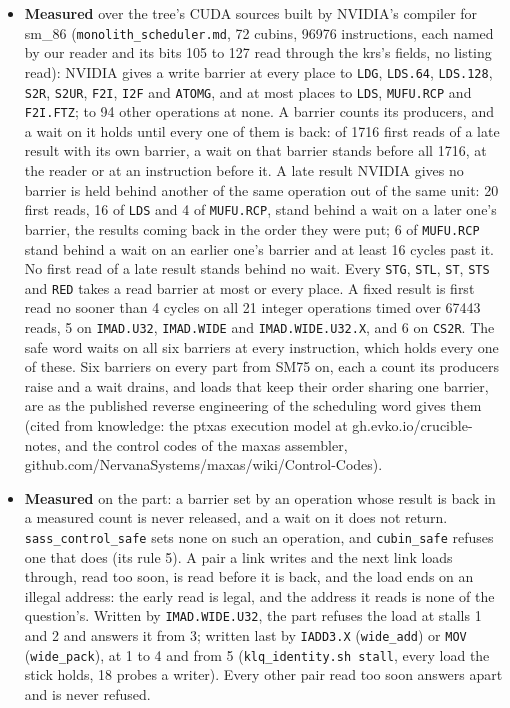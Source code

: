 \begin{itemize}
\item \textbf{Measured} over the tree's CUDA sources built by NVIDIA's compiler for sm\_\allowbreak{}86 (\texttt{monolith\_\allowbreak{}scheduler.\allowbreak{}md}, 72 cubins, 96976 instructions, each named by our reader and its bits 105 to 127 read through the krs's fields, no listing read): NVIDIA gives a write barrier at every place to \texttt{LDG}, \texttt{LDS.\allowbreak{}64}, \texttt{LDS.\allowbreak{}128}, \texttt{S2R}, \texttt{S2UR}, \texttt{F2I}, \texttt{I2F} and \texttt{ATOMG}, and at most places to \texttt{LDS}, \texttt{MUFU.\allowbreak{}RCP} and \texttt{F2I.\allowbreak{}FTZ}; to 94 other operations at none. A barrier counts its producers, and a wait on it holds until every one of them is back: of 1716 first reads of a late result with its own barrier, a wait on that barrier stands before all 1716, at the reader or at an instruction before it. A late result NVIDIA gives no barrier is held behind another of the same operation out of the same unit: 20 first reads, 16 of \texttt{LDS} and 4 of \texttt{MUFU.\allowbreak{}RCP}, stand behind a wait on a later one's barrier, the results coming back in the order they were put; 6 of \texttt{MUFU.\allowbreak{}RCP} stand behind a wait on an earlier one's barrier and at least 16 cycles past it. No first read of a late result stands behind no wait. Every \texttt{STG}, \texttt{STL}, \texttt{ST}, \texttt{STS} and \texttt{RED} takes a read barrier at most or every place. A fixed result is first read no sooner than 4 cycles on all 21 integer operations timed over 67443 reads, 5 on \texttt{IMAD.\allowbreak{}U32}, \texttt{IMAD.\allowbreak{}WIDE} and \texttt{IMAD.\allowbreak{}WIDE.\allowbreak{}U32.\allowbreak{}X}, and 6 on \texttt{CS2R}. The safe word waits on all six barriers at every instruction, which holds every one of these. Six barriers on every part from SM75 on, each a count its producers raise and a wait drains, and loads that keep their order sharing one barrier, are as the published reverse engineering of the scheduling word gives them (cited from knowledge: the ptxas execution model at gh.evko.io/crucible-notes, and the control codes of the maxas assembler, github.com/NervanaSystems/maxas/wiki/Control-Codes).
\item \textbf{Measured} on the part: a barrier set by an operation whose result is back in a measured count is never released, and a wait on it does not return. \texttt{sass\_\allowbreak{}control\_\allowbreak{}safe} sets none on such an operation, and \texttt{cubin\_\allowbreak{}safe} refuses one that does (its rule 5). A pair a link writes and the next link loads through, read too soon, is read before it is back, and the load ends on an illegal address: the early read is legal, and the address it reads is none of the question's. Written by \texttt{IMAD.\allowbreak{}WIDE.\allowbreak{}U32}, the part refuses the load at stalls 1 and 2 and answers it from 3; written last by \texttt{IADD3.\allowbreak{}X} (\texttt{wide\_\allowbreak{}add}) or \texttt{MOV} (\texttt{wide\_\allowbreak{}pack}), at 1 to 4 and from 5 (\texttt{klq\_\allowbreak{}identity.\allowbreak{}sh stall}, every load the stick holds, 18 probes a writer). Every other pair read too soon answers apart and is never refused.

\end{itemize}
